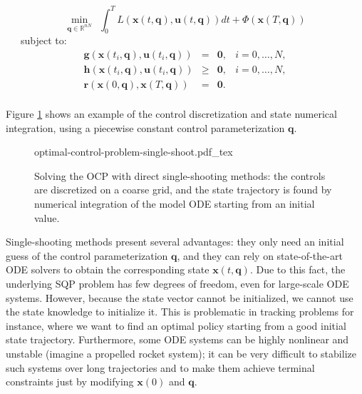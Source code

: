 \begin{equation}
  \min_{\mathbf{q}\in\mathbb R^{nN}} \ \ \int_{0}^{T}L (\mathbf{x}(t,\mathbf{q}),
  \mathbf{u}(t,\mathbf{q}))dt + \Phi(\mathbf{x}(T,\mathbf{q}))
\end{equation}
\ \ \ subject to:
\begin{equation}
  \begin{array}{rclr}
  \mathbf{g}(\mathbf{x}(t_i,\mathbf{q}), \mathbf{u}(t_i,\mathbf{q})) & = & \mathbf{0}, & i=0,\ldots,N,%
  \\%
  \mathbf{h}(\mathbf{x}(t_i,\mathbf{q}), \mathbf{u}(t_i,\mathbf{q})) & \ge & \mathbf{0}, & i=0,\ldots,N,%
  \\%
  \mathbf{r} (\mathbf{x}(0,\mathbf{q}), \mathbf{x}(T,\mathbf{q})) & = & \mathbf{0}.%
  \\%
  \end{array}
\end{equation} 

Figure \ref{fig:chap3-optimal-control-problem-single-shoot} shows an
example of the control discretization and state numerical integration,
using a piecewise constant control parameterization $\mathbf{q}$.

\begin{figure}
  \centering
      {\def\svgwidth{0.9\linewidth}
        
                   {optimal-control-problem-single-shoot.pdf_tex}
      }
      \caption{Solving the OCP with direct single-shooting methods:
        the controls are discretized on a coarse grid, and the state
        trajectory is found by numerical integration of the model ODE
        starting from an initial value.}
      \label{fig:chap3-optimal-control-problem-single-shoot}
\end{figure}

Single-shooting methods present several advantages: they only need an
initial guess of the control parameterization $\mathbf{q}$, and they
can rely on state-of-the-art ODE solvers to obtain the corresponding
state $\mathbf{x}(t,\mathbf{q})$. Due to this fact, the underlying SQP
problem has few degrees of freedom, even for large-scale ODE
systems. However, because the state vector cannot be initialized, we
cannot use the state knowledge to initialize it. This is problematic
in tracking problems for instance, where we want to find an optimal
policy starting from a good initial state trajectory. Furthermore,
some ODE systems can be highly nonlinear and unstable (imagine a
propelled rocket system); it can be very difficult to stabilize such
systems over long trajectories and to make them achieve terminal
constraints just by modifying $\mathbf{x}(0)$ and $\mathbf{q}$.


